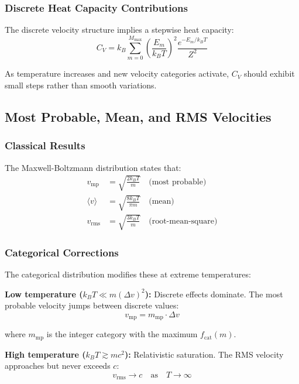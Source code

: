 \subsubsection{Discrete Heat Capacity Contributions}

The discrete velocity structure implies a stepwise heat capacity:
\begin{equation}
C_V = k_B \sum_{m=0}^{M_{\max}} \left(\frac{E_m}{k_B T}\right)^2 \frac{e^{-E_m/k_B T}}{Z^2}
\end{equation}

As temperature increases and new velocity categories activate, $C_V$ should exhibit small steps rather than smooth variations.

\subsection{Most Probable, Mean, and RMS Velocities}

\subsubsection{Classical Results}

The Maxwell-Boltzmann distribution states that:
\begin{align}
v_{\text{mp}} &= \sqrt{\frac{2k_B T}{m}} \quad \text{(most probable)} \\
\langle v \rangle &= \sqrt{\frac{8k_B T}{\pi m}} \quad \text{(mean)} \\
v_{\text{rms}} &= \sqrt{\frac{3k_B T}{m}} \quad \text{(root-mean-square)}
\end{align}

\subsubsection{Categorical Corrections}

The categorical distribution modifies these at extreme temperatures:

\textbf{Low temperature ($k_B T \ll m(\Delta v)^2$):} Discrete effects dominate. The most probable velocity jumps between discrete values:
\begin{equation}
v_{\text{mp}} = m_{\text{mp}} \cdot \Delta v
\end{equation}

where $m_{\text{mp}}$ is the integer category with the maximum $f_{\text{cat}}(m)$.

\textbf{High temperature ($k_B T \gtrsim mc^2$):} Relativistic saturation. The RMS velocity approaches but never exceeds $c$:
\begin{equation}
v_{\text{rms}} \to c \quad \text{as} \quad T \to \infty
\end{equation}

